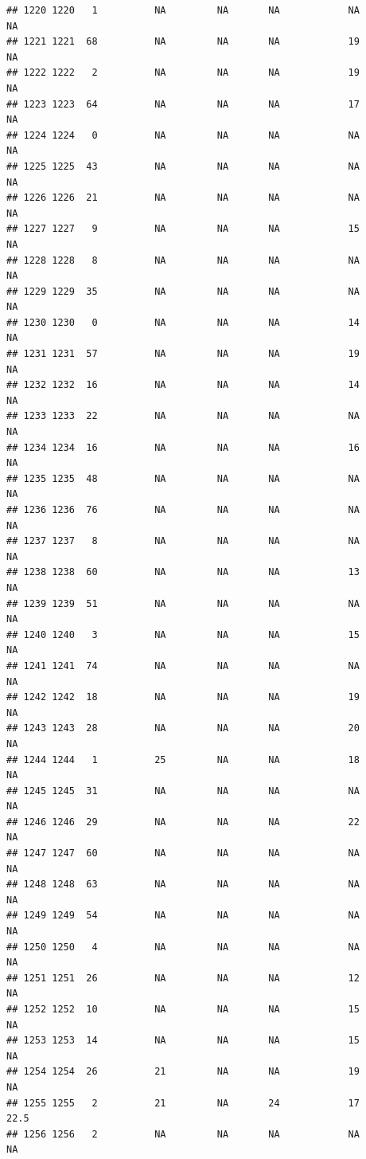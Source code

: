 \documentclass[man]{apa6}
\begin{document}
\begin{verbatim}
## 1220 1220   1          NA         NA       NA            NA       NA
## 1221 1221  68          NA         NA       NA            19       NA
## 1222 1222   2          NA         NA       NA            19       NA
## 1223 1223  64          NA         NA       NA            17       NA
## 1224 1224   0          NA         NA       NA            NA       NA
## 1225 1225  43          NA         NA       NA            NA       NA
## 1226 1226  21          NA         NA       NA            NA       NA
## 1227 1227   9          NA         NA       NA            15       NA
## 1228 1228   8          NA         NA       NA            NA       NA
## 1229 1229  35          NA         NA       NA            NA       NA
## 1230 1230   0          NA         NA       NA            14       NA
## 1231 1231  57          NA         NA       NA            19       NA
## 1232 1232  16          NA         NA       NA            14       NA
## 1233 1233  22          NA         NA       NA            NA       NA
## 1234 1234  16          NA         NA       NA            16       NA
## 1235 1235  48          NA         NA       NA            NA       NA
## 1236 1236  76          NA         NA       NA            NA       NA
## 1237 1237   8          NA         NA       NA            NA       NA
## 1238 1238  60          NA         NA       NA            13       NA
## 1239 1239  51          NA         NA       NA            NA       NA
## 1240 1240   3          NA         NA       NA            15       NA
## 1241 1241  74          NA         NA       NA            NA       NA
## 1242 1242  18          NA         NA       NA            19       NA
## 1243 1243  28          NA         NA       NA            20       NA
## 1244 1244   1          25         NA       NA            18       NA
## 1245 1245  31          NA         NA       NA            NA       NA
## 1246 1246  29          NA         NA       NA            22       NA
## 1247 1247  60          NA         NA       NA            NA       NA
## 1248 1248  63          NA         NA       NA            NA       NA
## 1249 1249  54          NA         NA       NA            NA       NA
## 1250 1250   4          NA         NA       NA            NA       NA
## 1251 1251  26          NA         NA       NA            12       NA
## 1252 1252  10          NA         NA       NA            15       NA
## 1253 1253  14          NA         NA       NA            15       NA
## 1254 1254  26          21         NA       NA            19       NA
## 1255 1255   2          21         NA       24            17     22.5
## 1256 1256   2          NA         NA       NA            NA       NA

\end{verbatim}
\end{document}
